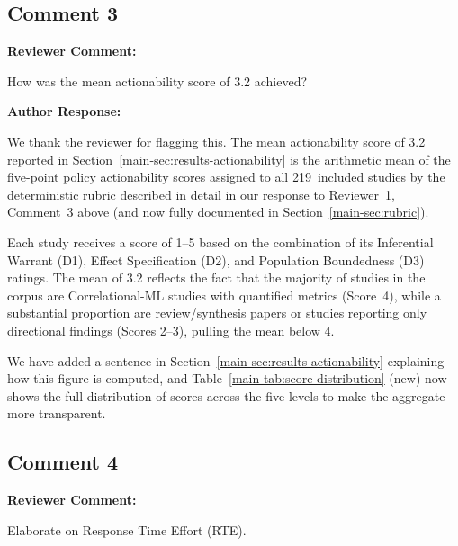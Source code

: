 \documentclass[12pt, a4paper]{article}
\newcommand{\R}[1]{Section~\ref{main-#1}}
\newcommand{\Rt}[1]{Table~\ref{main-#1}}
\newenvironment{reviewercomment}{%
  \begin{mdframed}[linecolor=reviewercolor, linewidth=1.5pt,
    backgroundcolor=reviewercolor!6, innertopmargin=8pt, innerbottommargin=8pt]
  \color{reviewercolor}\textbf{Reviewer Comment:}\normalcolor\par\smallskip
}{%
  \end{mdframed}\medskip
}
\newenvironment{authorresponse}{%
  \begin{mdframed}[linecolor=authorcolor, linewidth=1pt,
    backgroundcolor=authorcolor!5, innertopmargin=8pt, innerbottommargin=8pt]
  \color{authorcolor}\textbf{Author Response:}\normalcolor\par\smallskip
}{%
  \end{mdframed}\bigskip
}
\begin{document}
\subsection*{Comment 3}

\begin{reviewercomment}
How was the mean actionability score of 3.2 achieved?
\end{reviewercomment}

\begin{authorresponse}
We thank the reviewer for flagging this. The mean actionability score of
3.2 reported in \R{sec:results-actionability} is the arithmetic mean of
the five-point policy actionability scores assigned to all 219~included
studies by the deterministic rubric described in detail in our response
to Reviewer~1, Comment~3 above (and now fully documented in \R{sec:rubric}).

Each study receives a score of 1--5 based on the combination of its
Inferential Warrant (D1), Effect Specification (D2), and Population
Boundedness (D3) ratings. The mean of 3.2 reflects the fact that the
majority of studies in the corpus are Correlational-ML studies with
quantified metrics (Score~4), while a substantial proportion are
review/synthesis papers or studies reporting only directional findings
(Scores 2--3), pulling the mean below 4.

We have added a sentence in \R{sec:results-actionability} explaining
how this figure is computed, and \Rt{tab:score-distribution} (new) now
shows the full distribution of scores across the five levels to make the
aggregate more transparent.
\end{authorresponse}

\subsection*{Comment 4}

\begin{reviewercomment}
Elaborate on Response Time Effort (RTE).
\end{reviewercomment}
\end{document}
